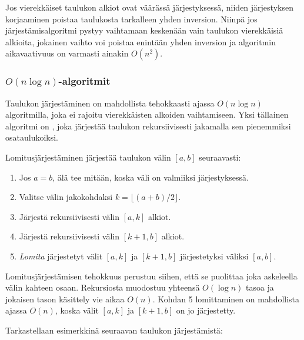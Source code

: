 Jos vierekkäiset taulukon alkiot
ovat väärässä järjestyksessä,
niiden järjestyksen korjaaminen
poistaa taulukosta tarkalleen yhden inversion.
Niinpä jos järjestämisalgoritmi pystyy
vaihtamaan keskenään vain
taulukon vierekkäisiä alkioita,
jokainen vaihto voi poistaa enintään yhden inversion
ja algoritmin aikavaativuus on varmasti ainakin $O(n^2)$.

\subsubsection{$O(n \log n)$-algoritmit}


Taulukon järjestäminen on mahdollista
tehokkaasti ajassa $O(n \log n)$
algoritmilla, joka ei rajoitu vierekkäisten
alkoiden vaihtamiseen.
Yksi tällainen algoritmi on
,
joka järjestää taulukon
rekursiivisesti jakamalla sen
pienemmiksi osataulukoiksi.

Lomitusjärjestäminen järjestää taulukon välin
$[a,b]$ seuraavasti:

\begin{enumerate}
\item Jos $a=b$, älä tee mitään, koska väli on valmiiksi järjestyksessä.
\item Valitse välin jakokohdaksi $k=\lfloor (a+b)/2 \rfloor$.
\item Järjestä rekursiivisesti välin $[a,k]$ alkiot.
\item Järjestä rekursiivisesti välin $[k+1,b]$ alkiot.
\item \emph{Lomita} järjestetyt välit $[a,k]$ ja $[k+1,b]$
järjestetyksi väliksi $[a,b]$.
\end{enumerate}

Lomitusjärjestämisen tehokkuus perustuu siihen,
että se puolittaa joka askeleella välin kahteen osaan.
Rekursiosta muodostuu yhteensä $O(\log n)$ tasoa
ja jokaisen tason käsittely vie aikaa $O(n)$.
Kohdan 5 lomittaminen on mahdollista ajassa $O(n)$,
koska välit $[a,k]$ ja $[k+1,b]$ on jo järjestetty.

Tarkastellaan esimerkkinä seuraavan taulukon
järjestämistä:
\begin{center}
\end{center}

